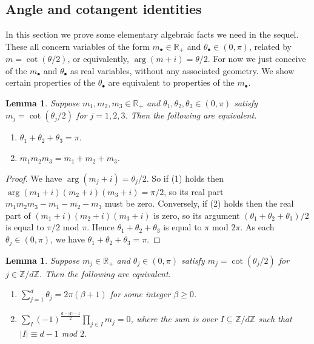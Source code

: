 \documentclass[12pt]{amsart}
\numberwithin{equation}{section}
\newtheorem{lem}[equation]{Lemma}
\theoremstyle{named}
\newcommand{\R}{\mathbb{R}}
\newcommand{\Z}{\mathbb{Z}}
\begin{document}
\subsection{Angle and cotangent identities}
\label{Sec:angles_cotangents}

In this section we prove some elementary algebraic facts we need in the sequel. These all concern variables of the form $m_\bullet \in \R_+$ and $\theta_\bullet \in (0, \pi)$, related by $m = \cot(\theta/2)$, or equivalently, $\arg(m + i) = \theta/2$. For now we just conceive of the $m_\bullet$ and $\theta_\bullet$ as real variables, without any associated geometry. We show certain properties of the $\theta_\bullet$ are equivalent to properties of the $m_\bullet$.

\begin{lem}
\label{Lem:triangle_equation_angle_sum}
Suppose $m_1, m_2, m_3 \in \R_+$ and $\theta_1, \theta_2, \theta_3 \in (0, \pi)$ satisfy $m_j = \cot(\theta_j/2)$ for $j=1,2,3$. Then the following are equivalent.
\begin{enumerate}
\item $\theta_1 + \theta_2 + \theta_3 = \pi$.
\item $m_1 m_2 m_3 = m_1 + m_2 + m_3$.
\end{enumerate}
\end{lem}

\begin{proof}
We have $\arg (m_j + i) = \theta_j / 2$. So if (1) holds then $\arg (m_1 + i) (m_2 + i) (m_3 + i) = \pi/2$, so its real part $m_1 m_2 m_3 - m_1 - m_2 - m_3$ must be zero. Conversely, if (2) holds then the real part of $(m_1 + i)(m_2 + i)(m_3 + i)$ is zero, so its argument $(\theta_1 + \theta_2 + \theta_3)/2$ is equal to $\pi/2$ mod $\pi$. Hence $\theta_1 + \theta_2 + \theta_3$ is equal to $\pi$ mod $2\pi$. As each $\theta_j \in (0, \pi)$, we have $\theta_1 + \theta_2 + \theta_3 = \pi$.
\end{proof}

\begin{lem}
\label{Lem:vertex_equation_angle_sum}
Suppose $m_j \in \R_+$ and $\theta_j \in (0, \pi)$ satisfy $m_j = \cot(\theta_j/2)$ for $j \in \Z/d\Z$. Then the following are equivalent.
\begin{enumerate}
\item $\sum_{j=1}^d \theta_j = 2\pi (\beta + 1)$ for some integer $\beta \geq 0$.
\item $\sum_{I} (-1)^{\frac{ d-|I|-1 }{2} } \prod_{j \in I} m_{j} = 0$, where the sum is over $I \subseteq \Z/d\Z$ such that $|I| \equiv d-1$ mod $2$.
\end{enumerate}
\end{lem}
\end{document}
